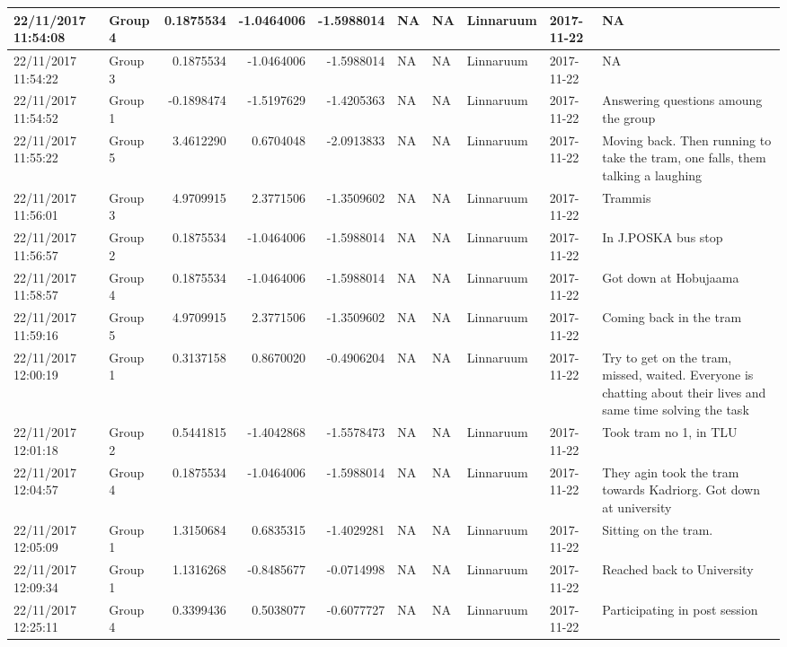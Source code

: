 \documentclass[]{article}
\begin{document}
\begin{tabular}{l|l|r|r|r|l|l|l|l|l}
\hline
22/11/2017 11:54:08 & Group 4 & 0.1875534 & -1.0464006 & -1.5988014 & NA & NA & Linnaruum & 2017-11-22 & NA\\
\hline
22/11/2017 11:54:22 & Group 3 & 0.1875534 & -1.0464006 & -1.5988014 & NA & NA & Linnaruum & 2017-11-22 & NA\\
\hline
22/11/2017 11:54:52 & Group 1 & -0.1898474 & -1.5197629 & -1.4205363 & NA & NA & Linnaruum & 2017-11-22 & Answering questions amoung the group\\
\hline
22/11/2017 11:55:22 & Group 5 & 3.4612290 & 0.6704048 & -2.0913833 & NA & NA & Linnaruum & 2017-11-22 & Moving back. Then running to take the tram, one falls, them talking a laughing\\
\hline
22/11/2017 11:56:01 & Group 3 & 4.9709915 & 2.3771506 & -1.3509602 & NA & NA & Linnaruum & 2017-11-22 & Trammis\\
\hline
22/11/2017 11:56:57 & Group 2 & 0.1875534 & -1.0464006 & -1.5988014 & NA & NA & Linnaruum & 2017-11-22 & In J.POSKA bus stop\\
\hline
22/11/2017 11:58:57 & Group 4 & 0.1875534 & -1.0464006 & -1.5988014 & NA & NA & Linnaruum & 2017-11-22 & Got down at Hobujaama\\
\hline
22/11/2017 11:59:16 & Group 5 & 4.9709915 & 2.3771506 & -1.3509602 & NA & NA & Linnaruum & 2017-11-22 & Coming back in the tram\\
\hline
22/11/2017 12:00:19 & Group 1 & 0.3137158 & 0.8670020 & -0.4906204 & NA & NA & Linnaruum & 2017-11-22 & Try to get on the tram, missed, waited. Everyone is chatting about their lives and same time solving the task\\
\hline
22/11/2017 12:01:18 & Group 2 & 0.5441815 & -1.4042868 & -1.5578473 & NA & NA & Linnaruum & 2017-11-22 & Took tram no 1, in TLU\\
\hline
22/11/2017 12:04:57 & Group 4 & 0.1875534 & -1.0464006 & -1.5988014 & NA & NA & Linnaruum & 2017-11-22 & They agin took the tram towards Kadriorg. Got down at university\\
\hline
22/11/2017 12:05:09 & Group 1 & 1.3150684 & 0.6835315 & -1.4029281 & NA & NA & Linnaruum & 2017-11-22 & Sitting on the tram.\\
\hline
22/11/2017 12:09:34 & Group 1 & 1.1316268 & -0.8485677 & -0.0714998 & NA & NA & Linnaruum & 2017-11-22 & Reached back to University\\
\hline
22/11/2017 12:25:11 & Group 4 & 0.3399436 & 0.5038077 & -0.6077727 & NA & NA & Linnaruum & 2017-11-22 & Participating in post session\\

\end{tabular}
\end{document}

